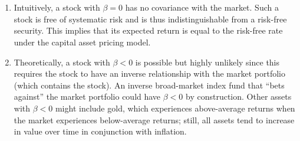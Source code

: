 \documentclass[12pt]{article}
\begin{document}
\section{}
\begin{enumerate}
    \item Intuitively, a stock with $\beta=0$ has no covariance with the market. Such a stock is free of systematic risk and is thus indistinguishable from a risk-free security. This implies that its expected return is equal to the risk-free rate under the capital asset pricing model.
    \item Theoretically, a stock with $\beta<0$ is possible but highly unlikely since this requires the stock to have an inverse relationship with the market portfolio (which contains the stock). An inverse broad-market index fund that ``bets against'' the market portfolio could have $\beta<0$ by construction. Other assets with $\beta<0$ might include gold, which experiences above-average returns when the market experiences below-average returns; still, all assets tend to increase in value over time in conjunction with inflation.
\end{enumerate}
\end{document}
